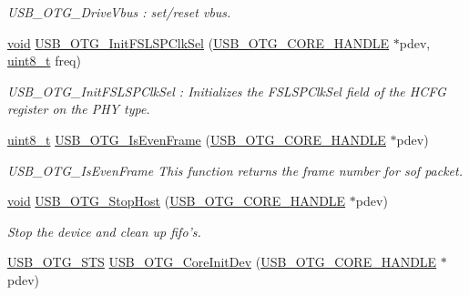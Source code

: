 \begin{DoxyCompactItemize}
\begin{DoxyCompactList}\small\item\em U\-S\-B\-\_\-\-O\-T\-G\-\_\-\-Drive\-Vbus \-: set/reset vbus. \end{DoxyCompactList}\item 
\hyperlink{group___n_a_m_e_ga18028b8badbf1ea7e704ccac3c488e82}{void} \hyperlink{group___u_s_b___c_o_r_e___exported___functions_prototype_ga20cd8b4154b178264dd822c2f8e7f7ea}{U\-S\-B\-\_\-\-O\-T\-G\-\_\-\-Init\-F\-S\-L\-S\-P\-Clk\-Sel} (\hyperlink{group___u_s_b___c_o_r_e___exported___types_gaf76054c11eb8a3367907aad7ae700e80}{U\-S\-B\-\_\-\-O\-T\-G\-\_\-\-C\-O\-R\-E\-\_\-\-H\-A\-N\-D\-L\-E} $\ast$pdev, \hyperlink{stdint_8h_aba7bc1797add20fe3efdf37ced1182c5}{uint8\-\_\-t} freq)
\begin{DoxyCompactList}\small\item\em U\-S\-B\-\_\-\-O\-T\-G\-\_\-\-Init\-F\-S\-L\-S\-P\-Clk\-Sel \-: Initializes the F\-S\-L\-S\-P\-Clk\-Sel field of the H\-C\-F\-G register on the P\-H\-Y type. \end{DoxyCompactList}\item 
\hyperlink{stdint_8h_aba7bc1797add20fe3efdf37ced1182c5}{uint8\-\_\-t} \hyperlink{group___u_s_b___c_o_r_e___exported___functions_prototype_gabb3be10118679d281845d0481ce39958}{U\-S\-B\-\_\-\-O\-T\-G\-\_\-\-Is\-Even\-Frame} (\hyperlink{group___u_s_b___c_o_r_e___exported___types_gaf76054c11eb8a3367907aad7ae700e80}{U\-S\-B\-\_\-\-O\-T\-G\-\_\-\-C\-O\-R\-E\-\_\-\-H\-A\-N\-D\-L\-E} $\ast$pdev)
\begin{DoxyCompactList}\small\item\em U\-S\-B\-\_\-\-O\-T\-G\-\_\-\-Is\-Even\-Frame This function returns the frame number for sof packet. \end{DoxyCompactList}\item 
\hyperlink{group___n_a_m_e_ga18028b8badbf1ea7e704ccac3c488e82}{void} \hyperlink{group___u_s_b___c_o_r_e___exported___functions_prototype_gafff12f2c6061cc4b957999421531fa6f}{U\-S\-B\-\_\-\-O\-T\-G\-\_\-\-Stop\-Host} (\hyperlink{group___u_s_b___c_o_r_e___exported___types_gaf76054c11eb8a3367907aad7ae700e80}{U\-S\-B\-\_\-\-O\-T\-G\-\_\-\-C\-O\-R\-E\-\_\-\-H\-A\-N\-D\-L\-E} $\ast$pdev)
\begin{DoxyCompactList}\small\item\em Stop the device and clean up fifo's. \end{DoxyCompactList}\item 
\hyperlink{group___u_s_b___c_o_r_e___exported___types_ga8b6504b9af0662f17515795db0f9c8ed}{U\-S\-B\-\_\-\-O\-T\-G\-\_\-\-S\-T\-S} \hyperlink{group___u_s_b___c_o_r_e___exported___functions_prototype_ga9e85559345e6e1eadde17fdbef28ebe2}{U\-S\-B\-\_\-\-O\-T\-G\-\_\-\-Core\-Init\-Dev} (\hyperlink{group___u_s_b___c_o_r_e___exported___types_gaf76054c11eb8a3367907aad7ae700e80}{U\-S\-B\-\_\-\-O\-T\-G\-\_\-\-C\-O\-R\-E\-\_\-\-H\-A\-N\-D\-L\-E} $\ast$pdev)

\end{DoxyCompactItemize}
